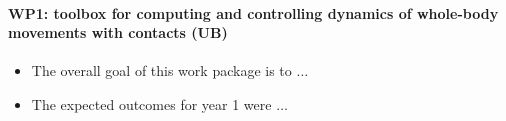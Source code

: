 \paragraph{WP1: toolbox for computing and controlling dynamics of whole-body movements with contacts (UB)}

\begin{itemize}
\item The overall goal of this work package is to $\dots$

\item The expected outcomes for year 1 were $\dots$  
\end{itemize}